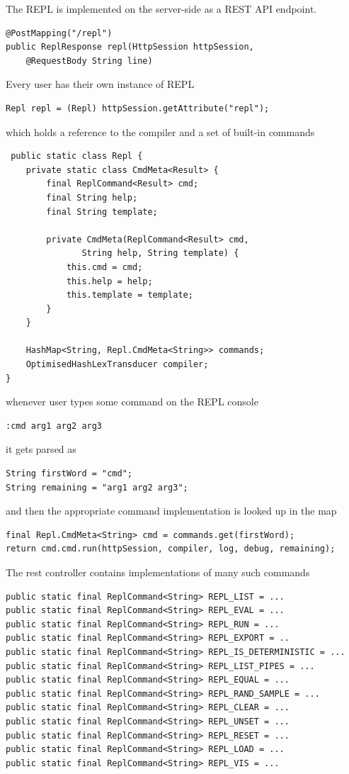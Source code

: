 The REPL is implemented on the server-side as a REST API endpoint. 
\begin{lstlisting}
@PostMapping("/repl")
public ReplResponse repl(HttpSession httpSession, 
    @RequestBody String line)
\end{lstlisting}
Every user has their own instance of REPL
\begin{lstlisting}
Repl repl = (Repl) httpSession.getAttribute("repl");
\end{lstlisting}
which holds a reference to the compiler and a set of built-in commands
\begin{lstlisting}
 public static class Repl {
    private static class CmdMeta<Result> {
        final ReplCommand<Result> cmd;
        final String help;
        final String template;
        
        private CmdMeta(ReplCommand<Result> cmd, 
               String help, String template) {
            this.cmd = cmd;
            this.help = help;
            this.template = template;
        }
    }
     
    HashMap<String, Repl.CmdMeta<String>> commands;
    OptimisedHashLexTransducer compiler;
}
\end{lstlisting}
whenever user types some command on the REPL console
\begin{lstlisting}
:cmd arg1 arg2 arg3
\end{lstlisting}
it gets parsed as
\begin{lstlisting}
String firstWord = "cmd";
String remaining = "arg1 arg2 arg3";
\end{lstlisting}
and then the appropriate command implementation is looked up in the map
\begin{lstlisting}
final Repl.CmdMeta<String> cmd = commands.get(firstWord);
return cmd.cmd.run(httpSession, compiler, log, debug, remaining);
\end{lstlisting}
The rest controller contains implementations of many such commands
\begin{lstlisting}
public static final ReplCommand<String> REPL_LIST = ...
public static final ReplCommand<String> REPL_EVAL = ...
public static final ReplCommand<String> REPL_RUN = ...
public static final ReplCommand<String> REPL_EXPORT = ..
public static final ReplCommand<String> REPL_IS_DETERMINISTIC = ...
public static final ReplCommand<String> REPL_LIST_PIPES = ...
public static final ReplCommand<String> REPL_EQUAL = ...
public static final ReplCommand<String> REPL_RAND_SAMPLE = ...
public static final ReplCommand<String> REPL_CLEAR = ...
public static final ReplCommand<String> REPL_UNSET = ...
public static final ReplCommand<String> REPL_RESET = ...
public static final ReplCommand<String> REPL_LOAD = ...
public static final ReplCommand<String> REPL_VIS = ...
\end{lstlisting}

